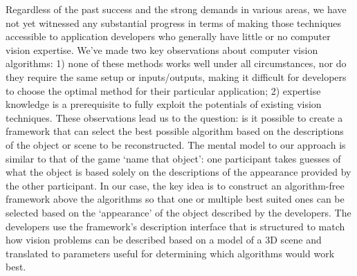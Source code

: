 Regardless of the past success and the strong demands in various areas, we have not yet witnessed any substantial progress in terms of making those techniques accessible to application developers who generally have little or no computer vision expertise. We've made two key observations about computer vision algorithms: 1) none of these methods works well under all circumstances, nor do they require the same setup or inputs/outputs, making it difficult for developers to choose the optimal method for their particular application; 2) expertise knowledge is a prerequisite to fully exploit the potentials of existing vision techniques. These observations lead us to the question: is it possible to create a framework that can select the best possible algorithm based on the descriptions of the object or scene to be reconstructed. The mental model to our approach is similar to that of the game `name that object': one participant takes guesses of what the object is based solely on the descriptions of the appearance provided by the other participant. In our case, the key idea is to construct an algorithm-free framework above the algorithms so that one or multiple best suited ones can be selected based on the `appearance' of the object described by the developers. The developers use the framework's description interface that is structured to match how vision problems can be described based on a model of a 3D scene and translated to parameters useful for determining which algorithms would work best.



